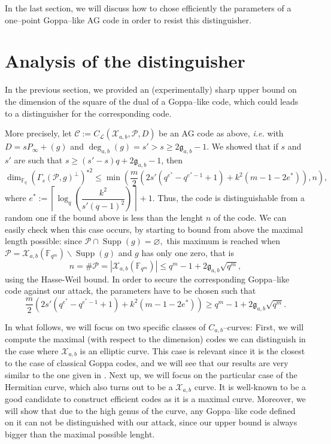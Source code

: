 \documentclass[a4paper]{article}
\theoremstyle{definition}
\theoremstyle{remark}
\newcommand{\calP}{\mathcal{P}}
\newcommand{\calL}{\mathcal{L}}
\newcommand{\calC}{\mathcal{C}}
\newcommand{\calX}{\mathcal{X}}
\newcommand{\fqm}{\mathbb{F}_{q^m}}
\newcommand{\fq}{\mathbb{F}_{q}}
\newcommand{\Supp}{\operatorname{Supp}}
\newcommand{\degab}[1]{\deg_{a,b}\left(#1\right)}
\begin{document}
In the last section, we will discuss how to chose efficiently the parameters of a one--point Goppa--like AG code in order to resist this distinguisher.

\section{Analysis of the distinguisher}

\noindent In the previous section, we provided an (experimentally) sharp upper bound on the dimension of the square of the dual of a Goppa--like code, which could leads to a distinguisher for the corresponding code. 

More precisely, let $\calC := C_\calL(\calX_{a,b},\calP,D)$ be an AG code as above, \emph{i.e.} with $D = sP_\infty +(g)$ and $\degab{g} = s'>s\geq 2\mathfrak{g}_{a,b}-1$. We showed that if $s$ and $s'$ are such that $s \geq (s'-s)q+2\mathfrak{g}_{a,b}-1$, then
\begin{equation} \label{eq:best_upper_bound}
\dim_{\fq} (\Gamma_s(\calP,g)^{\perp})^{\star 2} \leq \min \left(\frac{m}{2}\left(2s'(q^{e^*}-q^{e^*-1}+1)+k^2(m-1-2e^*)  \right),n\right),
\end{equation}
where $e^* := \left\lceil \log_q\left(\dfrac{k^2}{s'(q-1)^2}\right)\right\rceil+1$. Thus, the code is distinguishable from a random one if the bound above is less than the lenght $n$ of the code. We can easily check when this case occurs, by starting to bound from above the maximal length possible: since $\calP \cap \Supp(g) = \varnothing,$ this maximum is reached when $\calP = \calX_{a,b}(\fqm) \backslash \Supp(g)$ and $g$ has only one zero, that is
$$n = \# \calP = |\calX_{a,b}(\fqm)| \leq q^m-1+2\mathfrak{g}_{a,b}\sqrt{q^m},$$
using the Hasse-Weil bound. In order to secure the corresponding Goppa--like code against our attack, the parameters have to be chosen such that 
\begin{equation} \label{eq:cond_not_to_distinguish}
\frac{m}{2}\left(2s'(q^{e^*}-q^{e^*-1}+1)+k^2(m-1-2e^*)  \right)\geq q^m-1+2\mathfrak{g}_{a,b}\sqrt{q^m}.
\end{equation}

\noindent In what follows, we will focus on two specific classes of $C_{a,b}$--curves: First, we will compute the maximal (with respect to the dimension) codes we can distinguish in the case where $\calX_{a,b}$ is an elliptic curve. This case is relevant since it is the closest to the case of classical Goppa codes, and we will see that our results are very similar to the one given in \cite{MT21}. Next up, we will focus on the particular case of the Hermitian curve, which also turns out to be a $\calX_{a,b}$ curve. It is well-known to be a good candidate to construct efficient codes as it is a maximal curve. Moreover, we will show that due to the high genus of the curve, any Goppa--like code defined on it can not be distinguished with our attack, since our upper bound is always bigger than the maximal possible lenght.
\end{document}

